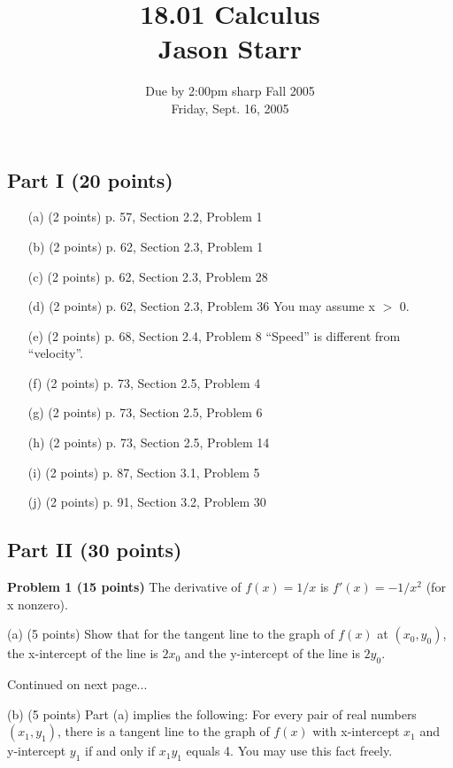 \documentclass{article}
\begin{document}
\subsection*{Part I (20 points)}
\begin{enumerate}
\item[(a)] (2 points) p. 57, Section 2.2, Problem 1
\item[(b)] (2 points) p. 62, Section 2.3, Problem 1
\item[(c)] (2 points) p. 62, Section 2.3, Problem 28
\item[(d)] (2 points) p. 62, Section 2.3, Problem 36 You may assume x $>$ 0. 
\item[(e)] (2 points) p. 68, Section 2.4, Problem 8 “Speed” is different from “velocity”.
\item[(f)] (2 points) p. 73, Section 2.5, Problem 4
\item[(g)] (2 points) p. 73, Section 2.5, Problem 6
\item[(h)] (2 points) p. 73, Section 2.5, Problem 14
\item[(i)] (2 points) p. 87, Section 3.1, Problem 5
\item[(j)] (2 points) p. 91, Section 3.2, Problem 30
\end{enumerate}

\subsection*{Part II (30 points)}

\noindent \textbf{Problem 1 (15 points)} The derivative of $f(x) = 1/x$ is $f'(x) = -1/x^2$ (for x nonzero).

(a) (5 points) Show that for the tangent line to the graph of $f(x)$ at $(x_0, y_0)$, the x-intercept of the line is $2x_0$ and the y-intercept of the line is $2y_0$.

\noindent Continued on next page...

\newpage

\title{18.01 Calculus\\
Jason Starr}
\date{Due by 2:00pm sharp Fall 2005\\
Friday, Sept. 16, 2005}
\maketitle

(b) (5 points) Part (a) implies the following: For every pair of real numbers $(x_1, y_1)$, there is a tangent line to the graph of $f(x)$ with x-intercept $x_1$ and y-intercept $y_1$ if and only if $x_1y_1$ equals 4. You may use this fact freely.
\end{document}
